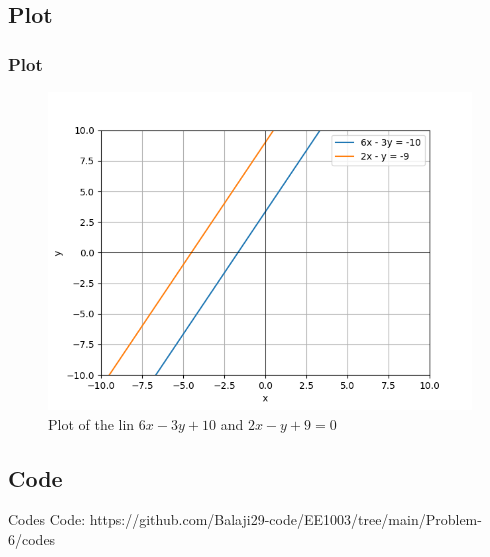 \documentclass{beamer}
\theoremstyle{remark}
\numberwithin{equation}{section}
\begin{document}
\subsection{Plot}
\begin{frame}
\frametitle{Plot}
\begin{figure}[h!]
   \centering
   \includegraphics[width=\columnwidth]{figs/fig.png}
   \caption{Plot of the lin $6x - 3y+10$ and $2x-y+9=0$}
   \label{stemplot}
\end{figure}
\end{frame}
\subsection{Code}
\begin{frame}{Codes}
   Code: https://github.com/Balaji29-code/EE1003/tree/main/Problem-6/codes
\end{frame}
\end{document}
